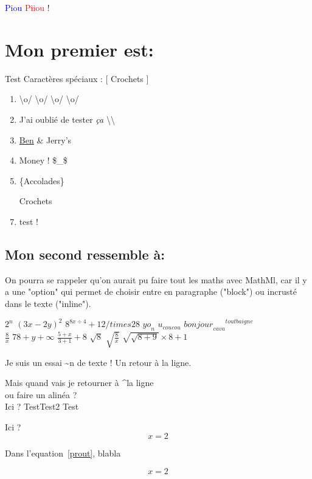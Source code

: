 \documentclass[10pt,a4paper]{report}
\begin{document}
\textcolor{blue}{Piou} \textcolor{red}{Piiou} !

\section{Mon premier est:}        

Test Caractères spéciaux : [ Crochets ]
\begin{enumerate}
\item \textbackslash o/ \textbackslash o/ \textbackslash o/ \textbackslash o/
\item J'ai oublié de tester \textit{ça} \textbackslash\textbackslash
\item \underline{Ben} \& Jerry's
\item Money ! \$\_\$
\item \{Accolades\}
\item [Crochets]
\item test !
\end{enumerate}

\subsection{Mon second ressemble à:}


On pourra se rappeler qu'on aurait pu faire tout les maths avec MathMl, car il y a une "option" qui permet de choisir entre en paragraphe ("block") ou incrusté dans le texte ("inline").

$ 2^n $
$ (3x - 2y)^2 $
$ 8^{8x \div 4} + 12 /times 28 $
$ {yo}_n $
$ u_{coucou} $
$ {{bonjour}_{ca va}}^{tout baigne} $
\\
$ \frac{8}{x} $
$ 78+y+\infty $
$ \frac{5+x}{3+1} + 8 $
$ \sqrt{8}$
$ \sqrt{\frac{8}{x}}$
$ \sqrt{\sqrt{8+9}} \times 8 +1 $

Je suis un essai \textasciitilde n de texte !
Un retour à la ligne.




Mais quand vais je retourner à \textasciicircum la ligne\\ ou faire un alinéa ?\\
Ici ? Test\newline Test2
Test

Ici ?
\begin{equation}
\label{prout}
x = 2
\end{equation}

Dans l'equation~\eqref{prout}, blabla

\begin{equation*}
\label{eq:2}
x = 2
\end{equation*}
\end{document}
